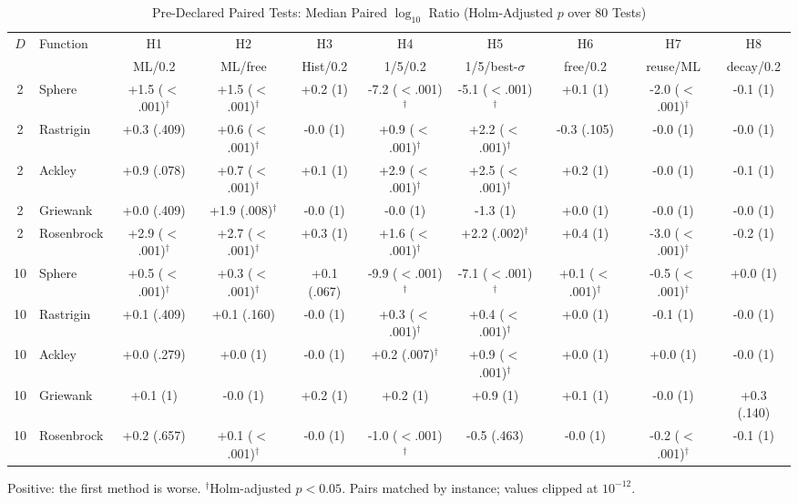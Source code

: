 \documentclass[conference]{IEEEtran}
\begin{document}
\begin{table}[t]
\centering
\caption{Pre-Declared Paired Tests: Median Paired $\log_{10}$ Ratio (Holm-Adjusted $p$ over 80 Tests)}
\label{tab:tests}
\scriptsize
\setlength{\tabcolsep}{2pt}
\begin{tabular}{@{}clcccccccc@{}}
\toprule
$D$ & Function & H1 & H2 & H3 & H4 & H5 & H6 & H7 & H8\\
 & & ML/0.2 & ML/free & Hist/0.2 & 1/5/0.2 & 1/5/best-$\sigma$ & free/0.2 & reuse/ML & decay/0.2\\
\midrule
2 & Sphere & +1.5 ($<$.001)$^\dagger$ & +1.5 ($<$.001)$^\dagger$ & +0.2 (1) & -7.2 ($<$.001)$^\dagger$ & -5.1 ($<$.001)$^\dagger$ & +0.1 (1) & -2.0 ($<$.001)$^\dagger$ & -0.1 (1) \\
2 & Rastrigin & +0.3 (.409) & +0.6 ($<$.001)$^\dagger$ & -0.0 (1) & +0.9 ($<$.001)$^\dagger$ & +2.2 ($<$.001)$^\dagger$ & -0.3 (.105) & -0.0 (1) & -0.0 (1) \\
2 & Ackley & +0.9 (.078) & +0.7 ($<$.001)$^\dagger$ & +0.1 (1) & +2.9 ($<$.001)$^\dagger$ & +2.5 ($<$.001)$^\dagger$ & +0.2 (1) & -0.0 (1) & -0.1 (1) \\
2 & Griewank & +0.0 (.409) & +1.9 (.008)$^\dagger$ & -0.0 (1) & -0.0 (1) & -1.3 (1) & +0.0 (1) & -0.0 (1) & -0.0 (1) \\
2 & Rosenbrock & +2.9 ($<$.001)$^\dagger$ & +2.7 ($<$.001)$^\dagger$ & +0.3 (1) & +1.6 ($<$.001)$^\dagger$ & +2.2 (.002)$^\dagger$ & +0.4 (1) & -3.0 ($<$.001)$^\dagger$ & -0.2 (1) \\
\midrule
10 & Sphere & +0.5 ($<$.001)$^\dagger$ & +0.3 ($<$.001)$^\dagger$ & +0.1 (.067) & -9.9 ($<$.001)$^\dagger$ & -7.1 ($<$.001)$^\dagger$ & +0.1 ($<$.001)$^\dagger$ & -0.5 ($<$.001)$^\dagger$ & +0.0 (1) \\
10 & Rastrigin & +0.1 (.409) & +0.1 (.160) & -0.0 (1) & +0.3 ($<$.001)$^\dagger$ & +0.4 ($<$.001)$^\dagger$ & +0.0 (1) & -0.1 (1) & -0.0 (1) \\
10 & Ackley & +0.0 (.279) & +0.0 (1) & -0.0 (1) & +0.2 (.007)$^\dagger$ & +0.9 ($<$.001)$^\dagger$ & +0.0 (1) & +0.0 (1) & -0.0 (1) \\
10 & Griewank & +0.1 (1) & -0.0 (1) & +0.2 (1) & +0.2 (1) & +0.9 (1) & +0.1 (1) & -0.0 (1) & +0.3 (.140) \\
10 & Rosenbrock & +0.2 (.657) & +0.1 ($<$.001)$^\dagger$ & -0.0 (1) & -1.0 ($<$.001)$^\dagger$ & -0.5 (.463) & -0.0 (1) & -0.2 ($<$.001)$^\dagger$ & -0.1 (1) \\
\bottomrule
\end{tabular}

\smallskip
\footnotesize Positive: the first method is worse. $^\dagger$Holm-adjusted $p<0.05$. Pairs matched by instance; values clipped at $10^{-12}$.
\end{table}
\end{document}
